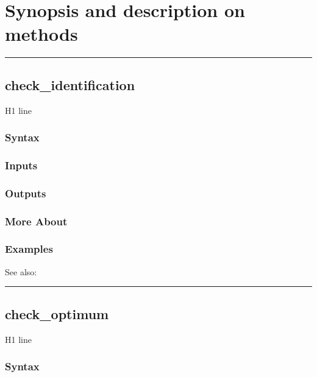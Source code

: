\documentclass[letterpaper,10pt,english]{sphinxmanual}
\begin{document}
\section{Synopsis and description on methods}
\label{classes/models/@rfvar/rfvar:synopsis-and-description-on-methods}

\bigskip\hrule{}\bigskip



\subsection{check\_identification}
\label{classes/models/@rfvar/rfvar:id1}\label{classes/models/@rfvar/rfvar:check-identification}
H1 line


\subsubsection{Syntax}
\label{classes/models/@rfvar/rfvar:syntax}

\subsubsection{Inputs}
\label{classes/models/@rfvar/rfvar:inputs}

\subsubsection{Outputs}
\label{classes/models/@rfvar/rfvar:outputs}

\subsubsection{More About}
\label{classes/models/@rfvar/rfvar:more-about}

\subsubsection{Examples}
\label{classes/models/@rfvar/rfvar:examples}
See also:


\bigskip\hrule{}\bigskip



\subsection{check\_optimum}
\label{classes/models/@rfvar/rfvar:check-optimum}\label{classes/models/@rfvar/rfvar:id2}
H1 line


\subsubsection{Syntax}
\label{classes/models/@rfvar/rfvar:id3}
\end{document}
